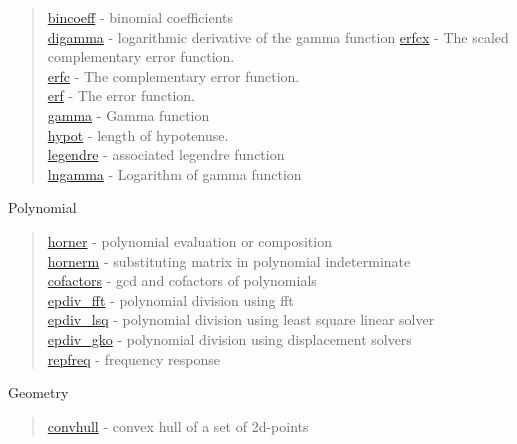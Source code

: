 \begin{quote}
\noindent
\hyperlink{bincoeff}{bincoeff} - {binomial coefficients}\\
\hyperlink{digamma}{digamma} - {logarithmic derivative of the gamma function}
\hyperlink{erfcx}{erfcx} - {The scaled complementary error function.}\\
\hyperlink{erfc}{erfc} - {The complementary error function.}\\
\hyperlink{erf}{erf} - {The error function.}\\
\hyperlink{gamma}{gamma} - {Gamma function}\\
\hyperlink{hypot}{hypot} - {length of hypotenuse.}\\
\hyperlink{legendre}{legendre} - associated legendre function\\
\hyperlink{lngamma}{lngamma} - {Logarithm of gamma function}\\
\end{quote}

Polynomial

\begin{quote}
\noindent
\hyperlink{horner}{horner} - polynomial evaluation or composition \\
\hyperlink{hornerm}{hornerm} - substituting matrix in polynomial indeterminate \\
\hyperlink{cofactors}{cofactors} - gcd and cofactors of polynomials \\
\hyperlink{epdiv_fft}{epdiv\_fft} - {polynomial division using fft}\\
\hyperlink{epdiv_lsq}{epdiv\_lsq} - {polynomial division using least square linear solver}\\
\hyperlink{epdiv_gko}{epdiv\_gko} - { polynomial division using displacement solvers}\\
\hyperlink{repfreq}{repfreq} - {frequency response} \\
\end{quote}


Geometry

\begin{quote}
\noindent
\hyperlink{convhull}{convhull} - {convex hull of a set of 2d-points}\\
\end{quote}


























